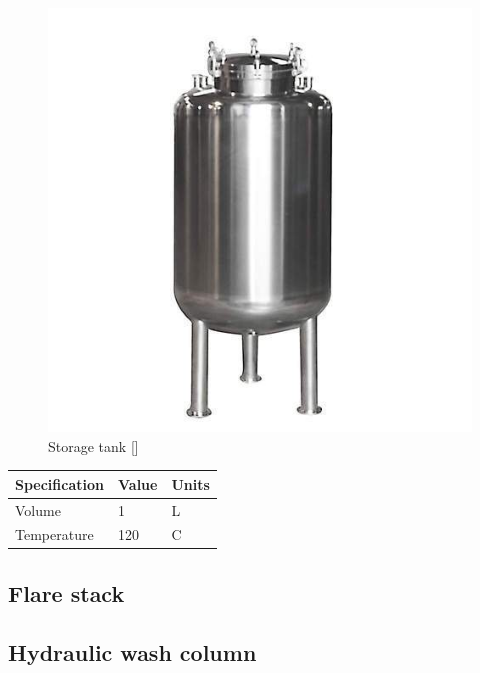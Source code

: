 \begin{figure}[H]
    \centering
    \includegraphics[width=\linewidth]{chapters/Z-support/figures/stainless-steel-storage-tank-500x500.jpg}
    \caption{Storage tank []}
\end{figure}

\begin{table}[H]
\centering
\begin{tabular}{@{}l|l|l@{}}
\toprule
\textbf{Specification}                    & \textbf{Value} & \textbf{Units} \\ \midrule
Volume                              & 1            & L            \\ \midrule
Temperature                     & 120     & C           \\ \bottomrule
\end{tabular}
\end{table}




\newpage
\subsection{Flare stack}

\newpage
\subsection{Hydraulic wash column}

